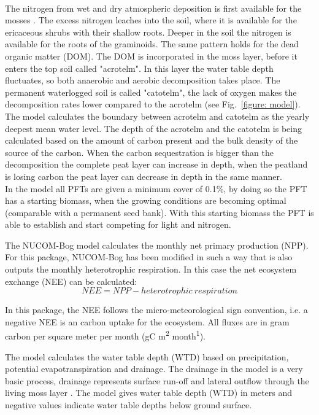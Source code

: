 \documentclass{article}\usepackage[]{graphicx}\usepackage[]{color}
\begin{document}
\\ The nitrogen from wet and dry atmospheric deposition is first available for the mosses \citep{Heijmans2002}. The excess nitrogen leaches into the soil, where it is available for the ericaceous shrubs with their shallow roots. Deeper in the soil the nitrogen is available for the roots of the graminoids. The same pattern holds for the dead organic matter (DOM). The DOM is incorporated in the moss layer, before it enters the top soil called "acrotelm". In this layer the water table depth fluctuates, so both anaerobic and aerobic decomposition takes place. The permanent waterlogged soil is called "catotelm", the lack of oxygen makes the decomposition rates lower compared to the acrotelm (see Fig.~\ref{figure: model}). The model calculates the boundary between acrotelm and catotelm as the yearly deepest mean water level. The depth of the acrotelm and the catotelm is being calculated based on the amount of carbon present and the bulk density of the source of the carbon. When the carbon sequestration is bigger than the decomposition the complete peat layer can increase in depth, when the peatland is losing carbon the peat layer can decrease in depth in the same manner.
\\ In the model all PFTs are given a minimum cover of 0.1\%, by doing so the PFT has a starting biomass, when the growing conditions are becoming optimal (comparable with a permanent seed bank). With this starting biomass the PFT is able to establish and start competing for light and nitrogen.

The NUCOM-Bog model \citep{Heijmans2008a} calculates the monthly net primary production (NPP). For this package, NUCOM-Bog has been modified in such a way that is also outputs the monthly heterotrophic respiration. In this case the net ecosystem exchange (NEE) can be calculated:
\begin{equation} \label{eq2}
NEE = NPP - heterotrophic\ respiration
\end{equation}

In this package, the NEE follows the micro-meteorological sign convention, i.e. a negative NEE is an carbon uptake for the ecosystem. All fluxes are in gram carbon per square meter per month (gC m\textsuperscript{2} month\textsuperscript{1}).

The model calculates the water table depth (WTD) based on precipitation, potential evapotranspiration and drainage. The drainage in the model is a very basic process, drainage represents surface run-off and lateral outflow through the living moss layer \citep{Heijmans2008a}. The model gives water table depth (WTD) in meters and negative values indicate water table depths below ground surface.
\end{document}
